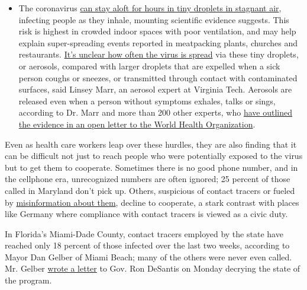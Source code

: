 \begin{itemize}
  \begin{itemize}
  \tightlist
  \item
    The coronavirus
    \href{https://www.nytimes.com/2020/07/04/health/239-experts-with-one-big-claim-the-coronavirus-is-airborne.html?action=click\&pgtype=Article\&state=default\&region=MAIN_CONTENT_3\&context=storylines_faq}{can
    stay aloft for hours in tiny droplets in stagnant air}, infecting
    people as they inhale, mounting scientific evidence suggests. This
    risk is highest in crowded indoor spaces with poor ventilation, and
    may help explain super-spreading events reported in meatpacking
    plants, churches and restaurants.
    \href{https://www.nytimes.com/2020/07/06/health/coronavirus-airborne-aerosols.html?action=click\&pgtype=Article\&state=default\&region=MAIN_CONTENT_3\&context=storylines_faq}{It's
    unclear how often the virus is spread} via these tiny droplets, or
    aerosols, compared with larger droplets that are expelled when a
    sick person coughs or sneezes, or transmitted through contact with
    contaminated surfaces, said Linsey Marr, an aerosol expert at
    Virginia Tech. Aerosols are released even when a person without
    symptoms exhales, talks or sings, according to Dr. Marr and more
    than 200 other experts, who
    \href{https://academic.oup.com/cid/article/doi/10.1093/cid/ciaa939/5867798}{have
    outlined the evidence in an open letter to the World Health
    Organization}.
  \end{itemize}
\end{itemize}

Even as health care workers leap over these hurdles, they are also
finding that it can be difficult not just to reach people who were
potentially exposed to the virus but to get them to cooperate. Sometimes
there is no good phone number, and in the cellphone era, unrecognized
numbers are often ignored; 25 percent of those called in Maryland don't
pick up. Others, suspicious of contact tracers or fueled by
\href{https://www.npr.org/sections/health-shots/2020/07/14/890628203/conspiracy-theories-aside-heres-what-contact-tracers-really-do}{misinformation
about them}, decline to cooperate, a stark contrast with places like
Germany where compliance with contact tracers is viewed as a civic duty.

In Florida's Miami-Dade County, contact tracers employed by the state
have reached only 18 percent of those infected over the last two weeks,
according to Mayor Dan Gelber of Miami Beach; many of the others were
never even called. Mr. Gelber
\href{https://twitter.com/CBoomerVazquez/status/1287841499422629889?ref_src=twsrc\%5Etfw\%7Ctwcamp\%5Etweetembed\%7Ctwterm\%5E1287850787830468613\%7Ctwgr\%5E\&ref_url=https\%3A\%2F\%2Fwww.local10.com\%2Fnews\%2Flocal\%2F2020\%2F07\%2F27\%2Fcoronavirus-in-miami-dade-contact-tracing-failures-and-talk-of-how-to-spend-federal-money\%2F}{wrote
a letter} to Gov. Ron DeSantis on Monday decrying the state of the
program.

